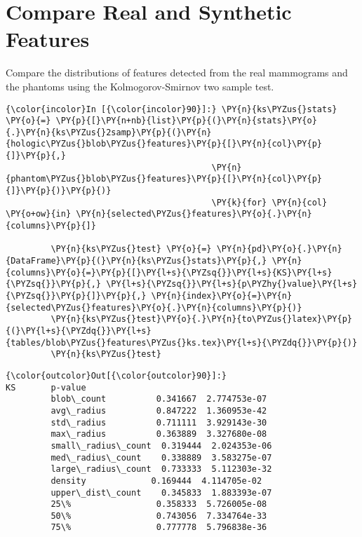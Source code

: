     \section{Compare Real and Synthetic
Features}\label{compare-real-and-synthetic-features}

    Compare the distributions of features detected from the real mammograms
and the phantoms using the Kolmogorov-Smirnov two sample test.

    \begin{Verbatim}[commandchars=\\\{\}]
{\color{incolor}In [{\color{incolor}90}]:} \PY{n}{ks\PYZus{}stats} \PY{o}{=} \PY{p}{[}\PY{n+nb}{list}\PY{p}{(}\PY{n}{stats}\PY{o}{.}\PY{n}{ks\PYZus{}2samp}\PY{p}{(}\PY{n}{hologic\PYZus{}blob\PYZus{}features}\PY{p}{[}\PY{n}{col}\PY{p}{]}\PY{p}{,}
                                         \PY{n}{phantom\PYZus{}blob\PYZus{}features}\PY{p}{[}\PY{n}{col}\PY{p}{]}\PY{p}{)}\PY{p}{)}
                                         \PY{k}{for} \PY{n}{col} \PY{o+ow}{in} \PY{n}{selected\PYZus{}features}\PY{o}{.}\PY{n}{columns}\PY{p}{]}

         \PY{n}{ks\PYZus{}test} \PY{o}{=} \PY{n}{pd}\PY{o}{.}\PY{n}{DataFrame}\PY{p}{(}\PY{n}{ks\PYZus{}stats}\PY{p}{,} \PY{n}{columns}\PY{o}{=}\PY{p}{[}\PY{l+s}{\PYZsq{}}\PY{l+s}{KS}\PY{l+s}{\PYZsq{}}\PY{p}{,} \PY{l+s}{\PYZsq{}}\PY{l+s}{p\PYZhy{}value}\PY{l+s}{\PYZsq{}}\PY{p}{]}\PY{p}{,} \PY{n}{index}\PY{o}{=}\PY{n}{selected\PYZus{}features}\PY{o}{.}\PY{n}{columns}\PY{p}{)}
         \PY{n}{ks\PYZus{}test}\PY{o}{.}\PY{n}{to\PYZus{}latex}\PY{p}{(}\PY{l+s}{\PYZdq{}}\PY{l+s}{tables/blob\PYZus{}features\PYZus{}ks.tex}\PY{l+s}{\PYZdq{}}\PY{p}{)}
         \PY{n}{ks\PYZus{}test}
\end{Verbatim}

            \begin{Verbatim}[commandchars=\\\{\}]
{\color{outcolor}Out[{\color{outcolor}90}]:}                           KS       p-value
         blob\_count          0.341667  2.774753e-07
         avg\_radius          0.847222  1.360953e-42
         std\_radius          0.711111  3.929143e-30
         max\_radius          0.363889  3.327680e-08
         small\_radius\_count  0.319444  2.024353e-06
         med\_radius\_count    0.338889  3.583275e-07
         large\_radius\_count  0.733333  5.112303e-32
         density             0.169444  4.114705e-02
         upper\_dist\_count    0.345833  1.883393e-07
         25\%                 0.358333  5.726005e-08
         50\%                 0.743056  7.334764e-33
         75\%                 0.777778  5.796838e-36
\end{Verbatim}

